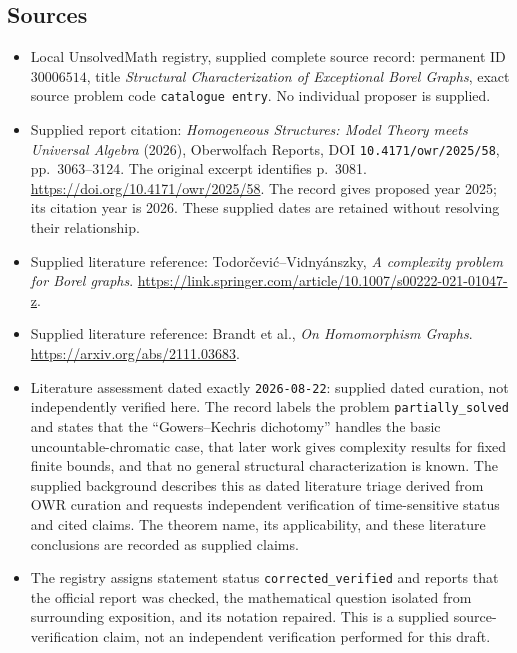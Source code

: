 \documentclass[11pt]{article}
\begin{document}
\subsection{Sources}
\begin{itemize}
\item Local UnsolvedMath registry, supplied complete source record: permanent ID \(30006514\), title \emph{Structural Characterization of Exceptional Borel Graphs}, exact source problem code \texttt{catalogue entry}. No individual proposer is supplied.
\item Supplied report citation: \emph{Homogeneous Structures: Model Theory meets Universal Algebra} (2026), Oberwolfach Reports, DOI \texttt{10.4171/owr/2025/58}, pp.\ 3063--3124. The original excerpt identifies p.\ 3081. \url{https://doi.org/10.4171/owr/2025/58}. The record gives proposed year 2025; its citation year is 2026. These supplied dates are retained without resolving their relationship.
\item Supplied literature reference: Todorčević--Vidnyánszky, \emph{A complexity problem for Borel graphs}. \url{https://link.springer.com/article/10.1007/s00222-021-01047-z}.
\item Supplied literature reference: Brandt et al., \emph{On Homomorphism Graphs}. \url{https://arxiv.org/abs/2111.03683}.
\item Literature assessment dated exactly \texttt{2026-08-22}: supplied dated curation, not independently verified here. The record labels the problem \texttt{partially\_solved} and states that the ``Gowers--Kechris dichotomy'' handles the basic uncountable-chromatic case, that later work gives complexity results for fixed finite bounds, and that no general structural characterization is known. The supplied background describes this as dated literature triage derived from OWR curation and requests independent verification of time-sensitive status and cited claims. The theorem name, its applicability, and these literature conclusions are recorded as supplied claims.
\item The registry assigns statement status \texttt{corrected\_verified} and reports that the official report was checked, the mathematical question isolated from surrounding exposition, and its notation repaired. This is a supplied source-verification claim, not an independent verification performed for this draft.
\end{itemize}
\end{document}
